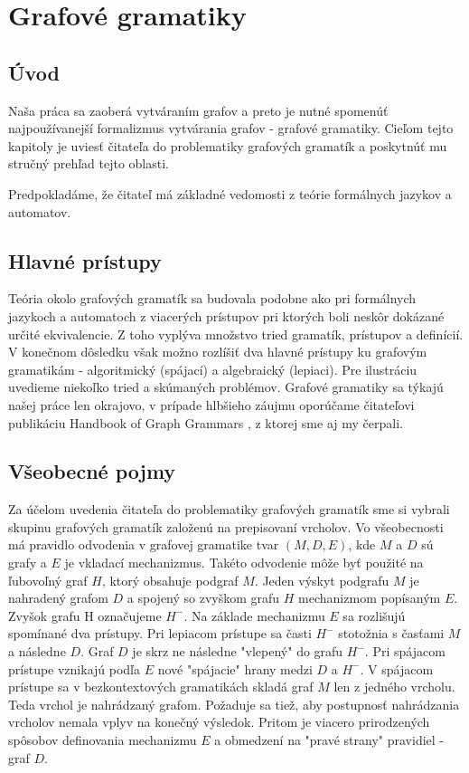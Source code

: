 
\chapter{Grafové gramatiky}%
\thispagestyle{empty}
\section{Úvod}
Naša práca sa zaoberá vytváraním grafov a preto je nutné spomenúť 
najpoužívanejší formalizmus vytvárania grafov - grafové gramatiky.
Cieľom tejto kapitoly je uviesť čitateľa do problematiky grafových 
gramatík a poskytnúť mu stručný prehľad tejto oblasti.

Predpokladáme, že čitateľ má základné vedomosti z teórie formálnych 
jazykov a automatov.

\section{Hlavné prístupy}
Teória okolo grafových gramatík sa budovala podobne ako pri formálnych
jazykoch a automatoch z viacerých prístupov pri ktorých boli neskôr dokázané
určité ekvivalencie. Z toho vyplýva množstvo tried gramatík, prístupov a
definícií.
V konečnom dôsledku však možno rozlíšiť dva hlavné prístupy ku grafovým
gramatikám - algoritmický (spájací) a algebraický (lepiaci).
Pre ilustráciu uvedieme niekoľko tried a skúmaných problémov.
Grafové gramatiky sa týkajú našej práce len okrajovo, v prípade hlbšieho 
záujmu oporúčame čitateľovi publikáciu Handbook of Graph Grammars \cite{GG} ,
z ktorej sme aj my čerpali.

\section{Všeobecné pojmy}
Za účelom uvedenia čitateľa do problematiky grafových gramatík sme si
vybrali skupinu grafových gramatík založenú na prepisovaní vrcholov. Vo
všeobecnosti má pravidlo odvodenia v grafovej gramatike tvar $(M, D, E)$,
kde $M$ a $D$ sú grafy a $E$ je vkladací mechanizmus. Takéto odvodenie môže
byť použité na ľubovoľný graf $H$, ktorý obsahuje podgraf $M$. Jeden výskyt
podgrafu $M$ je nahradený grafom $D$ a spojený so zvyškom grafu $H$
mechanizmom popísaným $E$. Zvyšok grafu H označujeme $H^{-}$.
Na základe mechanizmu $E$ sa rozlišujú spomínané dva prístupy. Pri lepiacom
prístupe sa časti $H^{-}$ stotožnia s časťami $M$ a následne $D$. Graf $D$
je skrz ne následne "vlepený" do grafu $H^{-}$.
Pri spájacom prístupe vznikajú podľa $E$ nové "spájacie" hrany medzi $D$ a 
$H^{-}$.
V spájacom prístupe sa v bezkontextových gramatikách skladá graf $M$ len z
jedného vrcholu. Teda vrchol je nahrádzaný grafom. Požaduje sa tiež, aby
postupnosť nahrádzania vrcholov nemala vplyv na konečný výsledok. Pritom je
viacero prirodzených spôsobov definovania mechanizmu $E$ a obmedzení na
"pravé strany" pravidiel - graf $D$.



